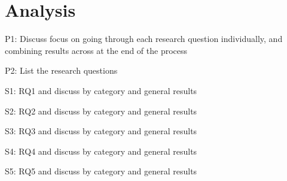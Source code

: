 \section{Analysis} \label{sec:analysis}


P1: Discuss focus on going through each research question individually, and combining results across at the end of the process

P2: List the research questions

S1: RQ1 and discuss by category and general results

S2: RQ2 and discuss by category and general results

S3: RQ3 and discuss by category and general results

S4: RQ4 and discuss by category and general results

S5: RQ5 and discuss by category and general results
